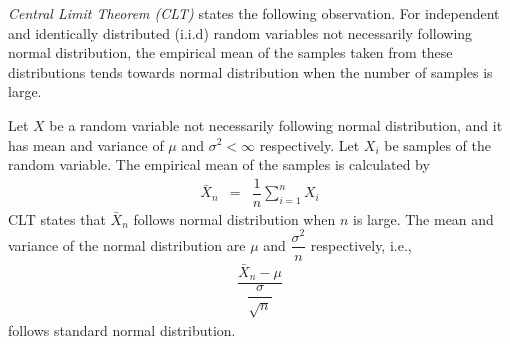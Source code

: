 \textit{Central Limit Theorem (CLT)} states the following observation. For independent and identically distributed (i.i.d) random variables not necessarily following normal distribution, the empirical mean of the samples taken from these distributions tends towards normal distribution when the number of samples is large.

Let $X$ be a random variable not necessarily following normal distribution, and it has mean and variance of $\mu$ and $\sigma^2<\infty$ respectively. Let $X_i$ be samples of the random variable. The empirical mean of the samples is calculated by
\begin{eqnarray}
	\bar{X}_n &=& \dfrac{1}{n}\sum_{i=1}^{n}X_i \nonumber
\end{eqnarray}
CLT states that $\bar{X}_n$ follows normal distribution when $n$ is large. The mean and variance of the normal distribution are $\mu$ and $\dfrac{\sigma^2}{n}$ respectively, i.e.,
\begin{eqnarray}
	\dfrac{\bar{X}_n-\mu}{\dfrac{\sigma}{\sqrt{n}}} \nonumber
\end{eqnarray}
follows standard normal distribution.